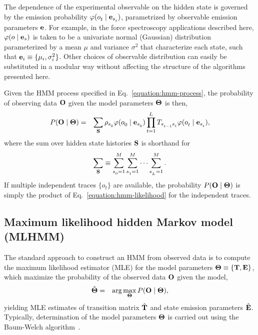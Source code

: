 \documentclass[aps,pre,twocolumn,superscriptaddress,nofootinbib,longbibliography]{revtex4-1}
\newcommand{\bfm}[1]{{\bf #1}}
\begin{document}
{{\color{magenta}The dependence of the experimental observable on the hidden state}
is governed by the emission probability $\varphi(o^{}_{t} \mid \bfm{e}_{s^{}_{t}})$, parametrized by observable emission parameters $\bfm{e}$.
For example, in the force spectroscopy applications described here, $\varphi(o \mid \bfm{e}_s)$ is taken to be a univariate normal (Gaussian) distribution parameterized by a mean $\mu$ and variance $\sigma^2$ that characterize each state, such that $\bfm{e}_i \equiv \{\mu_i, \sigma^2_i\}$.
Other choices of observable distribution can easily be substituted in a modular way without affecting the structure of the algorithms presented here.

Given the HMM process specified in Eq.~\ref{equation:hmm-process}, the probability of observing data $\bfm{O}$ given the model parameters $\bfm{\Theta}$ is then,
\begin{eqnarray}
P(\bfm{O} \mid \bfm{\Theta}) &=& \sum_{\bfm{S}}  \rho_{s^{}_{0}} \varphi(o^{}_{0} \mid \bfm{e}_{s^{}_{0}}) \prod_{t=1}^{L^{}} T_{s^{}_{t-1} s^{}_{t}} \varphi(o^{}_{t} \mid \bfm{e}_{s^{}_{t}}) \label{equation:hmm-likelihood} ,
\end{eqnarray}
where the sum over hidden state histories $\bfm{S}$ is shorthand for
\begin{eqnarray}
\sum_{\bfm{S}} \equiv \sum_{s^{}_{0}=1}^M \sum_{s^{}_{1}=1}^M \cdots \sum_{s^{}_{L^{}}=1}^M .
\end{eqnarray}
If multiple independent traces $\{o_t\}$ are available, the probability $P(\bfm{O} \mid \bfm{\Theta})$ is simply the product of Eq.~\ref{equation:hmm-likelihood} for the independent traces.

\subsection{Maximum likelihood hidden Markov model (MLHMM)}

The standard approach to construct an HMM from observed data is to compute the maximum likelihood estimator (MLE) for the model parameters $\bfm{\Theta} \equiv \{\bfm{T}, \bfm{E}\}$, which maximize the probability of the observed data $\bfm{O}$ given the model,
\begin{eqnarray}
\hat{\bfm{\Theta}} &=& \arg\max_\bfm{\Theta} P(\bfm{O} \mid \bfm{\Theta}) ,
\end{eqnarray}
yielding MLE estimates of transition matrix $\hat{\bfm{T}}$ and state emission parameters $\hat{\bfm{E}}$.
Typically, determination of the model parameters $\bfm{\Theta}$ is carried out using the Baum-Welch algorithm~\cite{baum:1970:ann-math-statist:baum-welch}.

}
\end{document}
